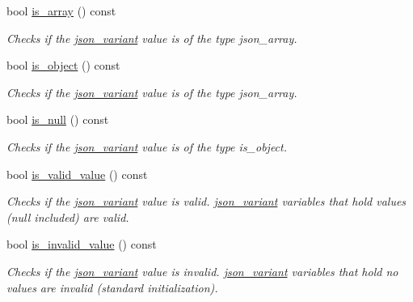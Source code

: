 \begin{DoxyCompactItemize}
bool \hyperlink{classJSONLIB__NAMESPACE_1_1json__variant_a72349dff71a411ac24eea6d943772df7}{is\+\_\+array} () const
\begin{DoxyCompactList}\small\item\em Checks if the \hyperlink{classJSONLIB__NAMESPACE_1_1json__variant}{json\+\_\+variant} value is of the type {\itshape json\+\_\+array}. \end{DoxyCompactList}\item 
bool \hyperlink{classJSONLIB__NAMESPACE_1_1json__variant_a28b4156626bd9f0e344ba1704c7590f3}{is\+\_\+object} () const
\begin{DoxyCompactList}\small\item\em Checks if the \hyperlink{classJSONLIB__NAMESPACE_1_1json__variant}{json\+\_\+variant} value is of the type {\itshape json\+\_\+array}. \end{DoxyCompactList}\item 
bool \hyperlink{classJSONLIB__NAMESPACE_1_1json__variant_abe8f66e81c598b6a9109a65e6844c5b5}{is\+\_\+null} () const
\begin{DoxyCompactList}\small\item\em Checks if the \hyperlink{classJSONLIB__NAMESPACE_1_1json__variant}{json\+\_\+variant} value is of the type {\itshape is\+\_\+object}. \end{DoxyCompactList}\item 
bool \hyperlink{classJSONLIB__NAMESPACE_1_1json__variant_a224aab2dd56e3928dd893be8b7f3367a}{is\+\_\+valid\+\_\+value} () const
\begin{DoxyCompactList}\small\item\em Checks if the \hyperlink{classJSONLIB__NAMESPACE_1_1json__variant}{json\+\_\+variant} value is valid. \hyperlink{classJSONLIB__NAMESPACE_1_1json__variant}{json\+\_\+variant} variables that hold values (null included) are valid. \end{DoxyCompactList}\item 
bool \hyperlink{classJSONLIB__NAMESPACE_1_1json__variant_ab6552a5e3de90ab1fbca078e5c245bfb}{is\+\_\+invalid\+\_\+value} () const
\begin{DoxyCompactList}\small\item\em Checks if the \hyperlink{classJSONLIB__NAMESPACE_1_1json__variant}{json\+\_\+variant} value is invalid. \hyperlink{classJSONLIB__NAMESPACE_1_1json__variant}{json\+\_\+variant} variables that hold no values are invalid (standard initialization). \end{DoxyCompactList}\item 

\end{DoxyCompactItemize}
